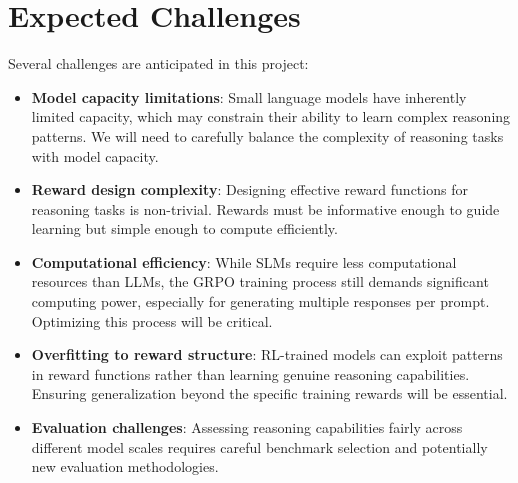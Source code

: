 \documentclass[11pt, oneside]{article}   	%
\begin{document}
\section*{Expected Challenges}

Several challenges are anticipated in this project:

\begin{itemize}
	\item \textbf{Model capacity limitations}: Small language models have inherently limited capacity, which may constrain their ability to learn complex reasoning patterns. We will need to carefully balance the complexity of reasoning tasks with model capacity.

	\item \textbf{Reward design complexity}: Designing effective reward functions for reasoning tasks is non-trivial. Rewards must be informative enough to guide learning but simple enough to compute efficiently.

	\item \textbf{Computational efficiency}: While SLMs require less computational resources than LLMs, the GRPO training process still demands significant computing power, especially for generating multiple responses per prompt. Optimizing this process will be critical.

	\item \textbf{Overfitting to reward structure}: RL-trained models can exploit patterns in reward functions rather than learning genuine reasoning capabilities. Ensuring generalization beyond the specific training rewards will be essential.

	\item \textbf{Evaluation challenges}: Assessing reasoning capabilities fairly across different model scales requires careful benchmark selection and potentially new evaluation methodologies.
\end{itemize}

\printbibliography
\end{document}
